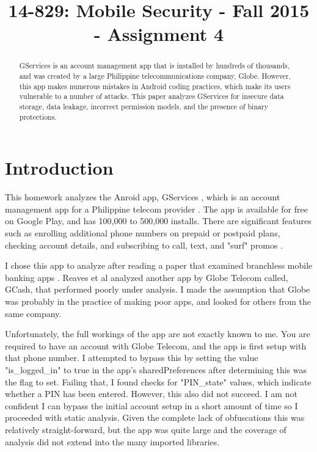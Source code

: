 \documentclass[conference,compsoc]{IEEEtran}
\begin{document}
\title{14-829: Mobile Security - Fall 2015 - Assignment 4}
\author{
}
\maketitle


\begin{abstract}
GServices is an account management app that is installed by hundreds of thousands, and was created by a large Philippine telecommunications company, Globe. However, this app makes numerous mistakes in Android coding practices, which make its users vulnerable to a number of attacks. This paper analyzes GServices for insecure data storage, data leakage, incorrect permission models, and the presence of binary protections. 
\end{abstract}



\section{Introduction}
This homework analyzes the Anroid app, GServices \cite{globefeatures}, which is an account management app for a Philippine telecom provider \cite{globe}. The app is available for free on Google Play\cite{gservices}, and has 100,000 to 500,000 installs. There are significant features such as enrolling additional phone numbers on prepaid or postpaid plans, checking account details, and subscribing to call, text, and "surf" promos \cite{globefeatures}.

I chose this app to analyze after reading a paper that examined branchless mobile banking apps \cite{190884}. Reaves et al analyzed another app by Globe Telecom called, GCash, that performed poorly under analysis. I made the assumption that Globe was probably in the practice of making poor apps, and looked for others from the same company.

Unfortunately, the full workings of the app are not exactly known to me. You are required to have an account with Globe Telecom, and the app is first setup with that phone number. I attempted to bypass this by setting the value "is\_logged\_in" to true in the app's sharedPreferences after determining this was the flag to set. Failing that, I found checks for "PIN\_state" values, which indicate whether a PIN has been entered.  However, this also did not succeed. I am not confident I can bypass the initial account setup in a short amount of time so I proceeded with static analysis. Given the complete lack of obfuscations this was relatively straight-forward, but the app was quite large and the coverage of analysis did not extend into the many imported libraries.
\end{document}
